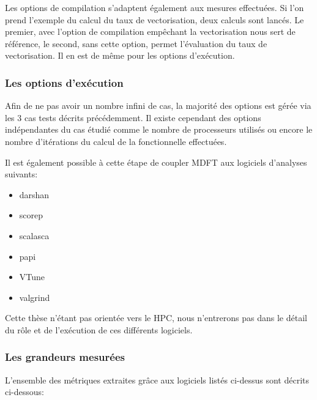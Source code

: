 Les options de compilation s'adaptent également aux mesures effectuées. Si l'on prend l'exemple du calcul du taux de vectorisation, deux calculs sont lancés. Le premier, avec l'option de compilation empêchant la vectorisation nous sert de référence, le second, sans cette option, permet l'évaluation du taux de vectorisation. Il en est de même pour les options d'exécution.


\subsubsection{Les options d'exécution}
Afin de ne pas avoir un nombre infini de cas, la majorité des options est gérée via les 3 cas tests décrits précédemment. Il existe cependant des options indépendantes du cas étudié comme le nombre de processeurs utilisés ou encore le nombre d’itérations du calcul de la fonctionnelle effectuées.

Il est également possible à cette étape de coupler MDFT aux logiciels d'analyses suivants:
\begin{itemize}
\item darshan
\item scorep
\item scalasca
\item papi
\item VTune
\item valgrind
\end{itemize}
Cette thèse n'étant pas orientée vers le HPC, nous n'entrerons pas dans le détail du rôle et de l’exécution de ces différents logiciels.


\subsubsection{Les grandeurs mesurées}
L'ensemble des métriques extraites grâce aux logiciels listés ci-dessus sont décrits ci-dessous:

